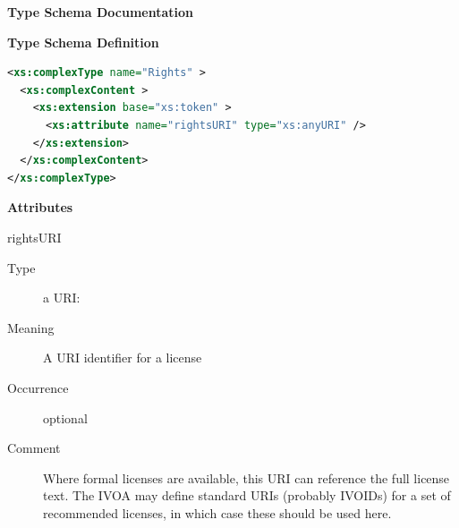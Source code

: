 \documentclass[11pt,a4paper]{ivoa}
\begin{document}
\begin{generated}
\begingroup
      	\renewcommand*\descriptionlabel[1]{%
      	\hbox to 5.5em{\emph{#1}\hfil}}\vspace{2ex}\noindent\textbf{ Type Schema Documentation}


\vspace{1ex}\noindent\textbf{ Type Schema Definition}

\begin{lstlisting}[language=XML,basicstyle=\footnotesize]
<xs:complexType name="Rights" >
  <xs:complexContent >
    <xs:extension base="xs:token" >
      <xs:attribute name="rightsURI" type="xs:anyURI" />
    </xs:extension>
  </xs:complexContent>
</xs:complexType>
\end{lstlisting}

\vspace{0.5ex}\noindent\textbf{ Attributes}

\begingroup\small\begin{bigdescription}
\item[rightsURI]
\begin{description}
\item[Type] a URI: 
\item[Meaning] 
                     A URI identifier for a license
                  
\item[Occurrence] optional
\item[Comment] 
                     Where formal licenses are available, this URI can
                     reference the full license text.  The IVOA may define
                     standard URIs (probably IVOIDs) for a set of recommended
                     licenses, in which case these should be used here.
                  
\end{description}


\end{bigdescription}\endgroup

\endgroup
\end{generated}
\end{document}
